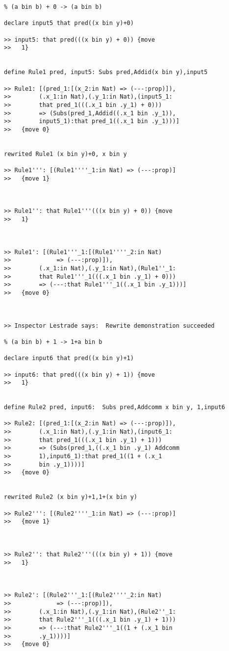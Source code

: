\documentclass{article}
\begin{document}
\begin{verbatim}
% (a bin b) + 0 -> (a bin b)

declare input5 that pred((x bin y)+0)

>> input5: that pred(((x bin y) + 0)) {move 
>>   1}


define Rule1 pred, input5: Subs pred,Addid(x bin y),input5

>> Rule1: [(pred_1:[(x_2:in Nat) => (---:prop)]),
>>        (.x_1:in Nat),(.y_1:in Nat),(input5_1:
>>        that pred_1(((.x_1 bin .y_1) + 0))) 
>>        => (Subs(pred_1,Addid((.x_1 bin .y_1)),
>>        input5_1):that pred_1((.x_1 bin .y_1)))]
>>   {move 0}


rewrited Rule1 (x bin y)+0, x bin y

>> Rule1''': [(Rule1''''_1:in Nat) => (---:prop)]
>>   {move 1}



>> Rule1'': that Rule1'''(((x bin y) + 0)) {move 
>>   1}



>> Rule1': [(Rule1'''_1:[(Rule1''''_2:in Nat) 
>>             => (---:prop)]),
>>        (.x_1:in Nat),(.y_1:in Nat),(Rule1''_1:
>>        that Rule1'''_1(((.x_1 bin .y_1) + 0))) 
>>        => (---:that Rule1'''_1((.x_1 bin .y_1)))]
>>   {move 0}



>> Inspector Lestrade says:  Rewrite demonstration succeeded

% (a bin b) + 1 -> 1+a bin b

declare input6 that pred((x bin y)+1)

>> input6: that pred(((x bin y) + 1)) {move 
>>   1}


define Rule2 pred, input6:  Subs pred,Addcomm x bin y, 1,input6

>> Rule2: [(pred_1:[(x_2:in Nat) => (---:prop)]),
>>        (.x_1:in Nat),(.y_1:in Nat),(input6_1:
>>        that pred_1(((.x_1 bin .y_1) + 1))) 
>>        => (Subs(pred_1,((.x_1 bin .y_1) Addcomm 
>>        1),input6_1):that pred_1((1 + (.x_1 
>>        bin .y_1))))]
>>   {move 0}


rewrited Rule2 (x bin y)+1,1+(x bin y)

>> Rule2''': [(Rule2''''_1:in Nat) => (---:prop)]
>>   {move 1}



>> Rule2'': that Rule2'''(((x bin y) + 1)) {move 
>>   1}



>> Rule2': [(Rule2'''_1:[(Rule2''''_2:in Nat) 
>>             => (---:prop)]),
>>        (.x_1:in Nat),(.y_1:in Nat),(Rule2''_1:
>>        that Rule2'''_1(((.x_1 bin .y_1) + 1))) 
>>        => (---:that Rule2'''_1((1 + (.x_1 bin 
>>        .y_1))))]
>>   {move 0}




\end{verbatim}
\end{document}
